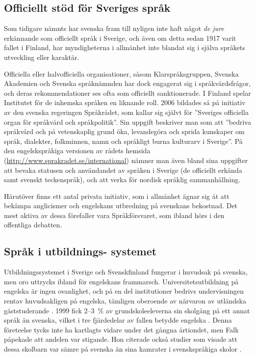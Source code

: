 \begin{multicols}{2}
\subsection{Officiellt stöd för Sveriges språk}

Som tidigare nämnts har svenska fram till nyligen inte haft något
\emph{de jure} erkännande som officiellt språk i Sverige, och även om
detta sedan 1917 varit fallet i Finland, har myndigheterna i allmänhet
inte blandat sig i själva språkets utveckling eller karaktär.


Officiella eller halvofficiella organisationer, såsom
Klarspråksgruppen, Svenska Akademien och Svenska språknämnden har dock
engagerat sig i språkvårdsfrågor, och deras rekommendationer ses ofta
som officiellt sanktionerade. I Finland spelar Institutet för de
inhemska språken en liknande roll. 2006 bildades så på initiativ av
den svenska regeringen Språkrådet, som kallar sig självt för
''Sveriges officiella organ för språkvård och språkpolitik''. Sin
uppgift beskriver man som att ''bedriva språkvård och på vetenskaplig
grund öka, levandegöra och sprida kunskaper om språk, dialekter,
folkminnen, namn och språkligt burna kulturarv i Sverige''. På den
engelskspråkiga versionen av rådets
hemsida (\url{http://www.sprakradet.se/international}) nämner man
även bland sina uppgifter att bevaka statusen och användandet av
språken i Sverige (de officiellt erkända samt svenskt teckenspråk),
och att verka för nordisk språklig sammanhållning.

Härutöver finns ett antal privata initiativ, som i allmänhet ägnar sig
åt att bekämpa anglicismer och engelskans utbredning på svenskans
bekostnad. Det mest aktiva av dessa förefaller vara Språkförsvaret,
som ibland hörs i den offentliga debatten.

\subsection[Språk i utbildningssystemet]{Språk i utbildnings- systemet}

Utbildningssystemet i Sverige och Svenskfinland fungerar i huvudsak på
svenska, men oro uttrycks ibland för engelskans
frammarsch. Universitetsutbildning på engelska är ingen ovanlighet,
och på en del institutioner bedrivs undervisningen rentav
huvudsakligen på engelska, tämligen oberoende av närvaron av utländska
gäststuderande \cite[25, 29f]{falk2001}. 1999 fick 2--3~\% av
grundskoleeleverna sin skolgång på ett annat språk än svenska, vilket
i tre fjärdedelar av fallen betydde engelska \cite[18f]{falk2001}. Denna
företeelse tycks inte ha kartlagts vidare under det gångna årtiondet,
men Falk påpekade att andelen var stigande. Hon citerade också studier
som visade att dessa skolbarn var sämre på svenska än sina kamrater i
svenskspråkiga skolor \cite[19]{falk2001}.


\end{multicols}
